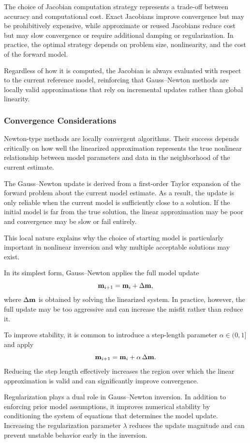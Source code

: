 The choice of Jacobian computation strategy represents a trade-off between accuracy and computational cost. Exact Jacobians improve convergence but may be prohibitively expensive, while approximate or reused Jacobians reduce cost but may slow convergence or require additional damping or regularization. In practice, the optimal strategy depends on problem size, nonlinearity, and the cost of the forward model.

Regardless of how it is computed, the Jacobian is always evaluated with respect to the current reference model, reinforcing that Gauss--Newton methods are locally valid approximations that rely on incremental updates rather than global linearity.

\subsubsection{Convergence Considerations}

Newton-type methods are locally convergent algorithms. Their success depends critically on how well the linearized approximation represents the true nonlinear relationship between model parameters and data in the neighborhood of the current estimate.

The Gauss--Newton update is derived from a first-order Taylor expansion of the forward problem about the current model estimate. As a result, the update is only reliable when the current model is sufficiently close to a solution. If the initial model is far from the true solution, the linear approximation may be poor and convergence may be slow or fail entirely.

This local nature explains why the choice of starting model is particularly important in nonlinear inversion and why multiple acceptable solutions may exist.

In its simplest form, Gauss--Newton applies the full model update
\[
    \vb{m}_{i+1} = \vb{m}_i + \Delta \vb{m},
\]
where $\Delta \vb{m}$ is obtained by solving the linearized system. In practice, however, the full update may be too aggressive and can increase the misfit rather than reduce it.

To improve stability, it is common to introduce a step-length parameter $\alpha \in (0,1]$ and apply
\[
    \vb{m}_{i+1} = \vb{m}_i + \alpha \, \Delta \vb{m}.
\]
Reducing the step length effectively increases the region over which the linear approximation is valid and can significantly improve convergence.

Regularization plays a dual role in Gauss--Newton inversion. In addition to enforcing prior model assumptions, it improves numerical stability by conditioning the system of equations that determines the model update. Increasing the regularization parameter $\lambda$ reduces the update magnitude and can prevent unstable behavior early in the inversion.

